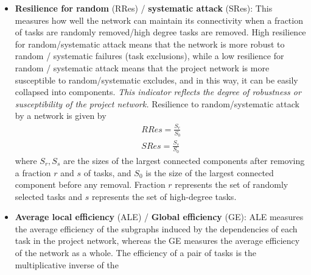 \documentclass[preprint,
3p]{elsarticle} %
\begin{document}
\begin{appendices}
\begin{itemize}
  given by \begin{equation}
  BEC_{ij} = \sum_{k,l \in V} \frac {\sigma_{kl}(i,j)} {\sigma_{kl}}
  \end{equation} \noindent where \(V\) is the set of tasks,
  \(\sigma_{kl}\) is the number of shortest paths between tasks \(k\)
  and \(l\), and \(\sigma_{kl}(i,j)\) is the number of shortest paths
  between tasks \(k\) and \(l\) that pass through dependency \((i,j)\).
  The edge-betweenness centralization of a network is given by
  \begin{equation}
  BEZ = \frac {\sum_{i,j} (BEC_{\max} - BEC_{ij})} {(n-1)(n-2)(n-3)}
  \label{eq:BEZ}
  \end{equation} \noindent where \(V\) is the set of tasks, \(n\) is the
  number of tasks, and \(BEC_{ij}\) and \(BEC_{kl}\) are the edge
  betweenness centralities of dependencies \((i,j)\) and \((k,l)\),
  respectively.
\item
  \textbf{Resilience for random} (RRes) / \textbf{systematic attack}
  (SRes): This measures how well the network can maintain its
  connectivity when a fraction of tasks are randomly removed/high degree
  tasks are removed. High resilience for random/systematic attack means
  that the network is more robust to random / systematic failures (task
  exclusions), while a low resilience for random / systematic attack
  means that the project network is more susceptible to
  random/systematic excludes, and in this way, it can be easily
  collapsed into components. \emph{This indicator reflects the degree of
  robustness or susceptibility of the project network.} Resilience to
  random/systematic attack by a network is given by \begin{eqnarray}
  RRes = \frac {S_r} {S_0} \label{eq:RRes}\\
  SRes = \frac {S_s} {S_0} \label{eq:SRes}
  \end{eqnarray} \noindent where \(S_r, S_s\) are the sizes of the
  largest connected components after removing a fraction \(r\) and \(s\)
  of tasks, and \(S_0\) is the size of the largest connected component
  before any removal. Fraction \(r\) represents the set of randomly
  selected tasks and \(s\) represents the set of high-degree tasks.
\item
  \textbf{Average local efficiency} (ALE) / \textbf{Global efficiency}
  (GE): ALE measures the average efficiency of the subgraphs induced by
  the dependencies of each task in the project network, whereas the GE
  measures the average efficiency of the network as a whole. The
  efficiency of a pair of tasks is the multiplicative inverse of the

\end{itemize}
\end{appendices}
\end{document}
